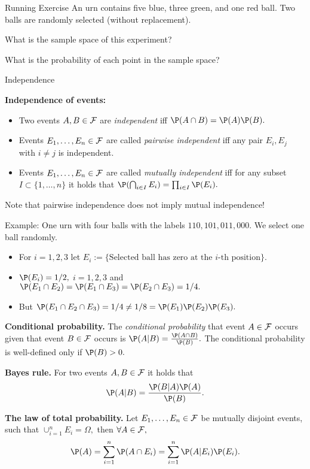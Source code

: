 \documentclass[11pt,compress,t,notes=noshow, xcolor=table]{beamer}
\begin{document}
\begin{vbframe}{Running Exercise}  
An urn contains five blue, three green, and one red ball. Two balls are randomly selected (without replacement).

\lz



What is the sample space of this experiment?


\lz

\lz
\lz
\lz

What is the probability of each point in the sample space?



\end{vbframe}

\begin{vbframe}{Independence}  


\textbf{Independence of events:} 
%		
\begin{itemize}
	\item 		Two events $A,B\in \mathcal{F}$ are \emph{independent} iff $\P(A \cap B)=\P(A)\P(B).$
	\item Events $E_1,\ldots,E_n \in \mathcal{F}$ are called \emph{pairwise independent} iff any pair $E_i,E_j$ with $i \neq j$ is independent.
	\item Events $E_1,\ldots,E_n \in \mathcal{F}$ are called \emph{mutually independent} iff for any  subset $I \subset \{1,\ldots,n\}$ it holds that  $\P(\bigcap_{i \in I} E_i )= \prod_{i \in I}\P(E_i).$
\end{itemize}
%		
Note that pairwise independence does not imply mutual independence! 

\lz

Example: One urn with four balls with the labels $110,101,011,000.$ We select one ball randomly.
\begin{itemize}
%	
	\item For $i=1,2,3$ let $E_i:=\{ \mbox{Selected ball has zero at the $i$-th position}  \}.$ 
%	
	\item $\P(E_i) = 1/2,$ $i=1,2,3$ and $\P(E_1 \cap E_2) = \P(E_1 \cap E_3) = \P(E_2 \cap E_3) =1/4.$
%	
	\item But $\P(E_1 \cap E_2 \cap E_3) = 1/4 \neq 1/8 = \P(E_1)\P(E_2)\P(E_3).$
%	
\end{itemize}
 


\framebreak

%
\textbf{Conditional probability.} The \emph{conditional probability} that event $A\in \mathcal{F}$ occurs given that event $B\in\mathcal{F}$ occurs is $\P(A|B)= \frac{\P(A\cap B)}{\P(B)}.$ The conditional probability is well-defined only if $\P(B) > 0.$


%	
\textbf{Bayes rule.} For two events $A,B\in \mathcal{F}$  it holds that $$\P(A|B)=\frac{\P(B|A) \P(A)}{\P(B)}.$$
%
\lz 

%
\textbf{The law of total probability.} Let $E_1,\ldots,E_n \in \mathcal{F}$  be mutually disjoint events, such that $\cup_{i=1}^n E_i = \Omega,$ then $ \forall A\in \mathcal{F},$ {  $$\P(A) = \sum_{i=1}^n \P(A \cap E_i) = \sum_{i=1}^n \P(A | E_i) \P(E_i).$$}
%	

\end{vbframe}
\end{document}

